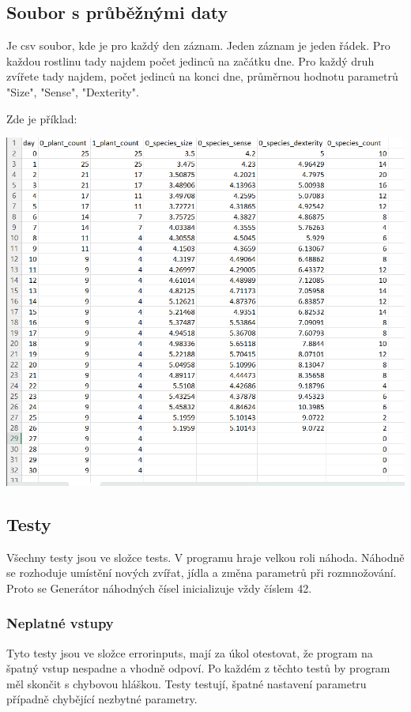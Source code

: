 \documentclass[10pt,a4paper]{article}
\begin{document}
\subsection{Soubor s průběžnými daty}
Je csv soubor, kde je pro každý den záznam. Jeden záznam je jeden řádek.
Pro každou rostlinu tady najdem počet jedinců na začátku dne. Pro každý druh zvířete tady najdem, počet jedinců na konci dne, průměrnou hodnotu parametrů 
"Size", "Sense", "Dexterity".

Zde je příklad: 

\includegraphics[scale=0.75]{vysledky}


\subsection{Testy}
Všechny testy jsou ve složce tests. V programu hraje velkou roli náhoda. Náhodně se rozhoduje umístění nových zvířat, jídla a změna parametrů při rozmnožování. Proto se Generátor náhodných čísel inicializuje vždy číslem 42.

\subsubsection{Neplatné vstupy}

Tyto testy jsou ve složce errorinputs, mají za úkol otestovat, že program na špatný vstup nespadne a vhodně odpoví.
Po každém z těchto testů by program měl skončit s chybovou hláškou. Testy testují, špatné nastavení parametru případně chybějící nezbytné parametry.
\end{document}
